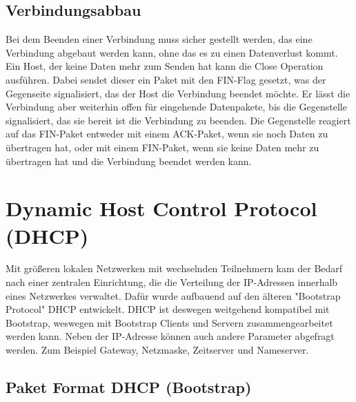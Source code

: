 \subsection{Verbindungsabbau}
Bei dem Beenden einer Verbindung muss sicher gestellt werden, das eine Verbindung abgebaut werden kann, ohne das es zu einen Datenverlust kommt. Ein Host, der keine Daten mehr zum Senden hat kann die Close Operation ausführen. Dabei sendet dieser ein Paket mit den FIN-Flag gesetzt, was der Gegenseite signalisiert, das der Host die Verbindung beendet möchte. Er lässt die Verbindung aber weiterhin offen für eingehende Datenpakete, bis die Gegenstelle signalisiert, das sie bereit ist die Verbindung zu beenden. Die Gegenstelle reagiert auf das FIN-Paket entweder mit einem ACK-Paket, wenn sie noch Daten zu übertragen hat, oder mit einem FIN-Paket, wenn sie keine Daten mehr zu übertragen hat und die Verbindung beendet werden kann. 

\section{Dynamic Host Control Protocol (DHCP)}
Mit größeren lokalen Netzwerken mit wechselnden Teilnehmern kam der Bedarf nach einer zentralen Einrichtung, die die Verteilung der IP-Adressen innerhalb eines Netzwerkes verwaltet. Dafür wurde aufbauend auf den älteren {}"Bootstrap Protocol{}" DHCP entwickelt. DHCP ist deswegen weitgehend kompatibel mit Bootstrap, weswegen mit Bootstrap Clients und Servern zusammengearbeitet werden kann. 
Neben der IP-Adresse können auch andere Parameter abgefragt werden. Zum Beispiel Gateway, Netzmaske, Zeitserver und Nameserver. 



\subsection{Paket Format DHCP (Bootstrap)}

